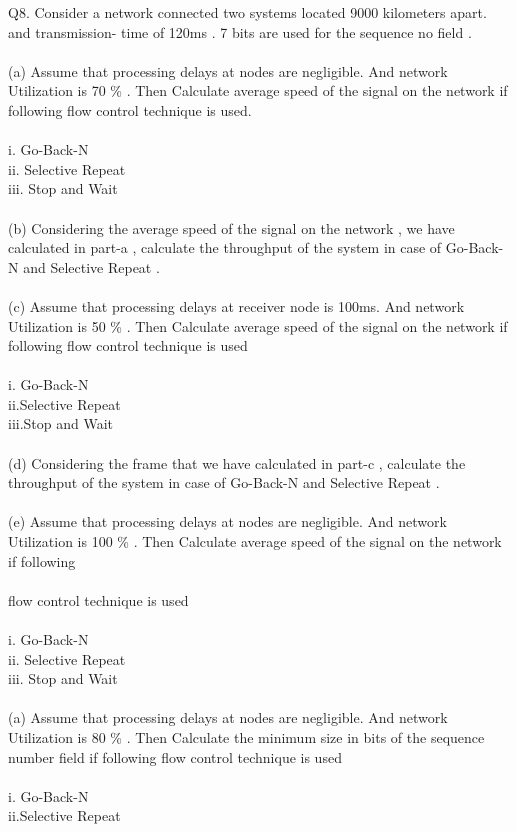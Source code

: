 \documentclass[a4paper,8pt]{article}
\begin{document}
 Q8. Consider a network connected two systems located 9000 kilometers apart. and transmission-
  time of 120ms . 7 bits are used for the sequence no field .\\\\
(a) Assume that processing delays at nodes are negligible. And network Utilization is
70 \% . Then Calculate average speed of the signal on the network if following flow
control technique is used.\\\\
i. Go-Back-N\\
ii. Selective Repeat\\
iii. Stop and Wait\\\\
(b) Considering the average speed of the signal on the network , we have calculated in
part-a , calculate the throughput of the system in case of Go-Back-N and Selective
Repeat .\\\\
(c) Assume that processing delays at receiver node is 100ms. And network Utilization
is 50 \% . Then Calculate average speed of the signal on the network if following flow
control technique is used\\\\
i. Go-Back-N\\
ii.Selective Repeat\\
iii.Stop and Wait\\\\
(d) Considering the frame that we have calculated in part-c , calculate the throughput
of the system in case of Go-Back-N and Selective Repeat .\\\\
(e) Assume that processing delays at nodes are negligible. And network Utilization is
100 \% . Then Calculate average speed of the signal on the network if following\\\\
flow control technique is used\\\\
i. Go-Back-N\\
ii. Selective Repeat\\
iii. Stop and Wait\\\\

(a) Assume that processing delays at nodes are negligible. And network Utilization is
80 \% . Then Calculate the minimum size in bits of the sequence number field if following 
flow control technique is used\\\\
i. Go-Back-N\\
ii.Selective Repeat\\\\
\end{document}
